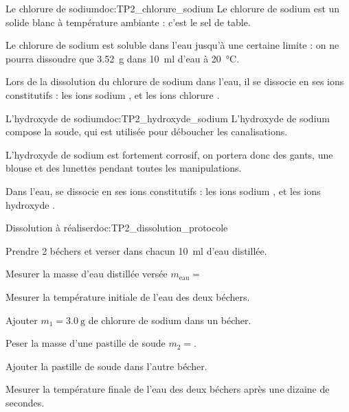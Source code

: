 \begin{multicols}{2}
  \begin{doc}{Le chlorure de sodium}{doc:TP2_chlorure_sodium}
    Le chlorure de sodium  est un solide blanc à température ambiante : c'est le sel de table.
    \vspace*{4pt}
    
    Le chlorure de sodium est soluble dans l'eau jusqu'à une certaine limite : on ne pourra dissoudre que \qty{3,52}{\g} dans \qty{10}{\ml} d'eau à \qty{20}{\degreeCelsius}.
    \vspace*{5pt}
  
    Lors de la dissolution du chlorure de sodium dans l'eau, il se dissocie en ses ions constitutifs : les ions sodium \ionSodium, et les ions chlorure \chlorure.
  \end{doc}
  
  \begin{doc}{L'hydroxyde de sodium}{doc:TP2_hydroxyde_sodium}
    L'hydroxyde de sodium  compose la soude, qui est utilisée pour déboucher les canalisations.
    \vspace*{-4pt}

    \begin{importants}  
      \attention L'hydroxyde de sodium est fortement corrosif, on portera donc des gants, une blouse et des lunettes pendant toutes les manipulations.
    \end{importants}
    \vspace*{-4pt}
  
    Dans l'eau,  se dissocie en ses ions constitutifs : les ions sodium \ionSodium, et les ions hydroxyde .
  \end{doc}
\end{multicols}

\begin{doc}{Dissolution à réaliser}{doc:TP2_dissolution_protocole}
  \begin{protocole}
      
    \item Prendre 2 béchers et verser dans chacun \qty{10}{\ml} d’eau distillée.
    \item Mesurer la masse d'eau distillée versée $m_\text{eau} =$
    \item Mesurer la température initiale de l'eau des deux béchers.
    \item Ajouter $m_1 = \qty{3,0}{\g}$ de chlorure de sodium dans un bécher.
    \item Peser la masse d'une pastille de soude $m_2 =$.
    \item Ajouter la pastille de soude dans l'autre bécher.
    \item Mesurer la température finale de l'eau des deux béchers après une dizaine de secondes.
  \end{protocole}
\end{doc}


